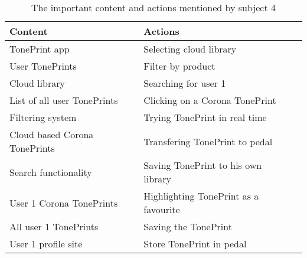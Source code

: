 \begin{table}[H]
\begin{minipage}[b]{\linewidth}\centering
	\begin{tabular} {|l|l|l|} \hline
		\rowcolor{xGray25} \textbf{Content} & \textbf{Actions} \\  \hline
		TonePrint app & Selecting cloud library \\
		User TonePrints & Filter by product \\
		Cloud library & Searching for user 1 \\
		List of all user TonePrints & Clicking on a Corona TonePrint \\
		Filtering system & Trying TonePrint in real time \\
		Cloud based Corona TonePrints & Transfering TonePrint to pedal \\
		Search functionality & Saving TonePrint to his own library \\
		User 1 Corona TonePrints & Highlighting TonePrint as a favourite \\
		All user 1 TonePrints & Saving the TonePrint \\
		User 1 profile site & Store TonePrint in pedal \\ \hline
	\end{tabular}
	\caption{The important content and actions mentioned by subject 4}
	\label{tab:Subject4ContentActions}
\end{minipage}
\end{table}


